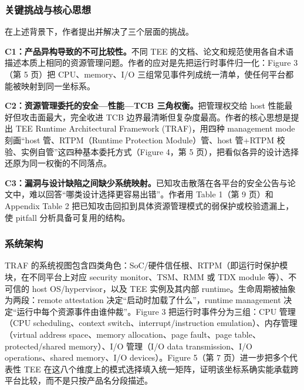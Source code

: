 \documentclass[11pt]{ctexart}
\begin{document}
\subsubsection{关键挑战与核心思想}
在上述背景下，作者提出并解决了三个层面的挑战。\par
\noindent\textbf{C1：产品异构导致的不可比较性。}不同 TEE 的文档、论文和规范使用各自术语描述本质上相同的资源管理问题。作者的应对是先把运行时事件归一化：Figure 3（第 5 页）把 CPU、memory、I/O 三组常见事件列成统一清单，使任何平台都能被映射到同一坐标系。\par
\noindent\textbf{C2：资源管理委托的安全—性能—TCB 三角权衡。}把管理权交给 host 性能最好但攻击面最大，完全收进 TCB 边界最清晰但复杂度最高。作者的核心思想是提出 TEE Runtime Architectural Framework (TRAF)，用四种 management mode 刻画``host 管、RTPM（Runtime Protection Module）管、host 管+RTPM 校验、实例自管''这四种基本委托方式（Figure 4，第 5 页），把看似各异的设计选择还原为同一权衡的不同落点。\par
\noindent\textbf{C3：漏洞与设计缺陷之间缺少系统映射。}已知攻击散落在各平台的安全公告与论文中，难以回答``哪类设计选择更容易出错''。作者用 Table 1（第 9 页）和 Appendix Table 2 把已知攻击回扣到具体资源管理模式的弱保护或校验遗漏上，使 pitfall 分析具备可复用的结构。\par
\subsubsection{系统架构}
TRAF 的系统视图包含四类角色：SoC/硬件信任根、RTPM（即运行时保护模块，在不同平台上对应 security monitor、TSM、RMM 或 TDX module 等）、不可信的 host OS/hypervisor，以及 TEE 实例及其内部 runtime。生命周期被抽象为两段：remote attestation 决定``启动时加载了什么''，runtime management 决定``运行中每个资源事件由谁仲裁''。Figure 3 把运行时事件分为三组：CPU 管理（CPU scheduling、context switch、interrupt/instruction emulation）、内存管理（virtual address space、memory allocation、page fault、page table、protected/shared memory）、I/O 管理（I/O data transmission、I/O operations、shared memory、I/O devices）。Figure 5（第 7 页）进一步把多个代表性 TEE 在这八个维度上的模式选择填入统一矩阵，证明该坐标系确实能承载跨平台比较，而不是只按产品名分段描述。\par
\end{document}
